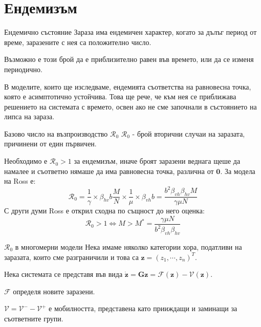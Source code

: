 \section{\hspace{1em}Ендемизъм}
\begin{frame}[t]{Ендемично състояние}
  Зараза има ендемичен характер, когато за дълъг период от време, заразените с нея са положително число.

  Възможно е този брой да е приблизително равен във времето, или да се изменя периодично.

  В моделите, които ще изследваме, ендемията съответства на равновесна точка, която е асимптотично устойчива. Това ще рече, че към нея се приближава решението на системата с времето, освен ако не сме започнали в състоянието на липса на зараза.
\end{frame}

\begin{frame}[t]{Базово число на възпроизводство $\mathscr{R}_0$}
  $\mathscr{R}_0$ - брой вторични случаи на заразата, причинени от един първичен.

  Необходимо е $\mathscr{R}_0 > 1$ за ендемизъм,
  иначе броят заразени веднага щеше да намалее и съответно нямаше да има равновесна точка, различна от $\boldsymbol{0}$. За модела на Ross е:
  \begin{equation}
    \mathscr{R}_0 = \frac{1}{\gamma} \times \beta_{hv} b \frac{M}{N} \times \frac{1}{\mu} \times \beta_{vh} b = \frac{b^2 \beta_{vh} \beta_{hv} M}{\gamma \mu N}
  \end{equation}
  С други думи Ross е открил сходна по същност до него оценка:
  \begin{equation}
    \mathscr{R}_0 > 1 \iff M > M^* = \frac{\gamma \mu N}{b^2 \beta_{vh} \beta_{hv}}
  \end{equation}
\end{frame}

\begin{frame}[t]{$\mathscr{R}_0$ в многомерни модели}
  Нека имаме няколко категории хора, податливи на заразата, които сме разграничили и това са $\boldsymbol{z} = (z_1, \cdots, z_n)^T$.

  Нека системата се представя във вида $\dot{\boldsymbol{z}} = \boldsymbol{G}{\boldsymbol{z}} = \mathscr{F}(\boldsymbol{z}) - \mathscr{V}(\boldsymbol{z})$.

  $\mathscr{F}$ определя новите заразени.

  $\mathscr{V} = \mathscr{V}^- - \mathscr{V}^+$ е мобилността, представена като прииждащи и заминащи за съответните групи.
\end{frame}


